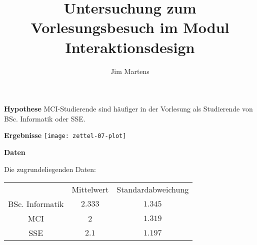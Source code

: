 \documentclass[14pt]{beamer}
\begin{document}
\author{Jim Martens}
\title{\bfseries \color{black}Untersuchung zum Vorlesungsbesuch im Modul Interaktionsdesign}

\renewcommand{\figurename}{Figure}

\begin{frame}
	\titlepage
\end{frame}

\begin{frame}{\bfseries \color{black}Hypothese}
	MCI-Studierende sind häufiger in der Vorlesung als Studierende von BSc. Informatik oder SSE.
\end{frame}

\begin{frame}{\bfseries \color{black}Ergebnisse}
	\centering
	\texttt{[image: zettel-07-plot]}
\end{frame}

\begin{frame}{\bfseries \color{black}Daten}

Die zugrundeliegenden Daten:

\begin{tabular}{ccc}
	& Mittelwert & Standardabweichung \\
	BSc. Informatik & $2.333$ & $1.345$ \\
	MCI & 2 & $1.319$ \\
	SSE & $2.1$ & $1.197$ 
\end{tabular}
\end{frame}
\end{document}
